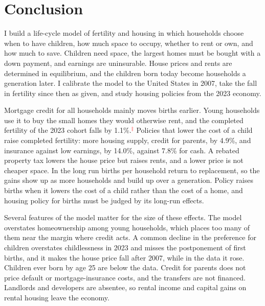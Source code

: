 \section{Conclusion}
\label{sec:conclusion}

I build a life-cycle model of fertility and housing in which households
choose when to have children, how much space to occupy, whether to rent or
own, and how much to save. Children need space, the largest homes must be
bought with a down payment, and earnings are uninsurable. House prices and
rents are determined in equilibrium, and the children born today become
households a generation later. I calibrate the model to the United States in
2007, take the fall in fertility since then as given, and study housing
policies from the 2023 economy.

Mortgage credit for all households mainly moves births earlier. Young
households use it to buy the small homes they would otherwise rent, and the
completed fertility of the 2023 cohort falls by
1.1\%.\textcolor{red}{$^{\ddagger}$} Policies that lower the cost of a child
raise completed fertility: more housing supply, credit for parents, by 4.9\%,
and insurance against low earnings, by 14.0\%, against 7.8\% for cash. A
rebated property tax lowers the house price but raises rents, and a lower
price is not cheaper space. In the long run births per household return to
replacement, so the gains show up as more households and build up over a
generation. Policy raises births when it lowers the cost of a child rather
than the cost of a home, and housing policy for births must be judged by its
long-run effects.

Several features of the model matter for the size of these effects. The model
overstates homeownership among young households, which places too many of
them near the margin where credit acts. A common decline in the preference
for children overstates childlessness in 2023 and misses the postponement of
first births, and it makes the house price fall after 2007, while in the data
it rose. Children ever born by age 25 are below the data. Credit for parents
does not price default or mortgage-insurance costs, and the transfers are not
financed. Landlords and developers are absentee, so rental income and capital
gains on rental housing leave the economy.
